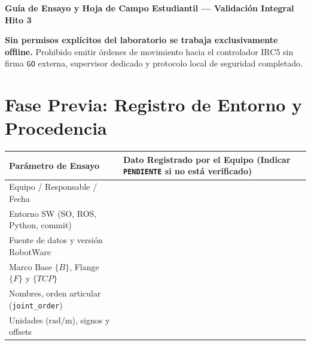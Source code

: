 \documentclass[10.5pt, a4paper]{article}
\begin{document}
\begin{center}
    \Large\textbf{\textcolor{ucbblue}{Guía de Ensayo y Hoja de Campo Estudiantil — Validación Integral Hito 3}}
\end{center}

\begin{tcolorbox}[colback=red!5, colframe=red!80!black, title=\textbf{Condición Operativa de Campo}, left=2mm, right=2mm, top=1mm, bottom=1mm]
    \footnotesize\raggedright
    \textbf{Sin permisos explícitos del laboratorio se trabaja exclusivamente offline.} Prohibido emitir órdenes de movimiento hacia el controlador IRC5 sin firma \texttt{GO} externa, supervisor dedicado y protocolo local de seguridad completado.
\end{tcolorbox}

\section{Fase Previa: Registro de Entorno y Procedencia}
\begingroup
\footnotesize
\renewcommand{\arraystretch}{1.45}
\noindent\begin{tabularx}{\textwidth}{|>{\hsize=0.65\hsize\raggedright\arraybackslash}X|>{\hsize=1.35\hsize\raggedright\arraybackslash}X|}
\hline
\rowcolor{ucbblue!15}
\textbf{Parámetro de Ensayo} & \textbf{Dato Registrado por el Equipo (Indicar \texttt{PENDIENTE} si no está verificado)} \\ \hline
Equipo / Responsable / Fecha & \\ \hline
Entorno SW (SO, ROS, Python, commit) & \\ \hline
Fuente de datos y versión RobotWare & \\ \hline
Marco Base $\{B\}$, Flange $\{F\}$ y $\{TCP\}$ & \\ \hline
Nombres, orden articular (\texttt{joint\_order}) & \\ \hline
Unidades ($\mathrm{rad}/\mathrm{m}$), signos y offsets & \\ \hline
\end{tabularx}\par
\endgroup
\end{document}
